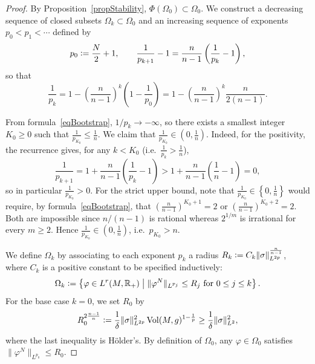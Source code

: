 \documentclass[10pt,a4paper]{amsart}
\newcommand{\bR}{\mathbb{R}}
\newcommand{\definedas}{\mathrel{\raise.095ex\hbox{\rm :}\mkern-5.2mu=}}
\renewcommand{\phi}{\varphi}
\DeclareMathOperator{\vol}{Vol}
\begin{document}
\begin{proof}
	By Proposition~\ref{propStability}, $\Phi(\Omega_0) \subset \Omega_0$. We
	construct a decreasing sequence of closed subsets $\Omega_k \subset \Omega_0$
	and an increasing sequence of exponents $p_0 < p_1 < \cdots$ defined by
	\[
		p_0 \definedas \frac{N}{2}+1,
		\qquad
		\frac{1}{p_{k+1}} - 1 = \frac{n}{n-1} \left(\frac{1}{p_k} - 1\right),
	\]
	so that
	\begin{equation}\label{eqBootstrap}
		\frac{1}{p_k} = 1 - \left(\frac{n}{n-1}\right)^k \left(1 - \frac{1}{p_0}\right)
		= 1 - \left(\frac{n}{n-1}\right)^k \frac{n}{2(n-1)}.
	\end{equation}

	From formula~\eqref{eqBootstrap}, $1/p_k \to -\infty$, so there exists a
	smallest integer $K_0 \geq 0$ such that $\frac{1}{p_{K_0}} \leq \frac{1}{n}$.
	We claim that $\frac{1}{p_{K_0}} \in \left(0, \frac{1}{n}\right)$. Indeed, for
	the positivity, the recurrence gives, for any $k < K_0$ (i.e.\
	$\frac{1}{p_k} > \frac{1}{n}$),
	\[
		\frac{1}{p_{k+1}} = 1 + \frac{n}{n-1}\left(\frac{1}{p_k} - 1\right)
		> 1 + \frac{n}{n-1}\left(\frac{1}{n} - 1\right) = 0,
	\]
	so in particular $\frac{1}{p_{K_0}} > 0$. For the strict upper bound, note that
	$\frac{1}{p_{K_0}} \in \left\{0, \frac{1}{n}\right\}$ would require, by
	formula~\eqref{eqBootstrap}, that $\left(\frac{n}{n-1}\right)^{K_0+1} = 2$ or
	$\left(\frac{n}{n-1}\right)^{K_0+2} = 2$. Both are impossible since
	$n/(n-1)$ is rational whereas $2^{1/m}$ is irrational for every $m \geq 2$.
	Hence $\frac{1}{p_{K_0}} \in \left(0, \frac{1}{n}\right)$, i.e.\ $p_{K_0} > n$.

	We define $\Omega_k$ by associating to each exponent $p_k$ a radius $R_k
		\definedas C_k \|\sigma\|_{L^{2p}}^{\frac{n}{n-1}}$, where $C_k$ is a positive
	constant to be specified inductively:
	\[
		\Omega_k \definedas \left\{\phi \in L^r(M, \bR_+) \;\middle|\;
		\|\phi^N\|_{L^{p_j}} \leq R_j\ \text{for}\ 0 \leq j \leq k\right\}.
	\]
	For the base case $k = 0$, we set $R_0$ by
	\[
		R_0^{2\frac{n-1}{n}} \definedas \frac{1}{\delta} \|\sigma\|_{L^{2p}}^2 \vol(M, g)^{1-\frac{1}{p}}
		\geq \frac{1}{\delta} \|\sigma\|_{L^2}^2,
	\]
	where the last inequality is H\"older's. By definition of $\Omega_0$, any $\phi
		\in \Omega_0$ satisfies $\|\phi^N\|_{L^{p_0}} \leq R_0$.


\end{proof}
\end{document}
